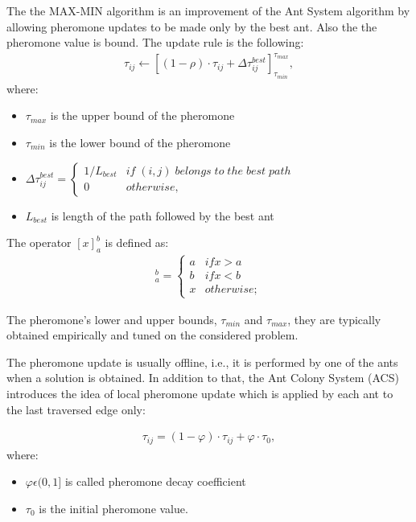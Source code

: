 The the MAX-MIN algorithm is an improvement of the Ant System algorithm by allowing pheromone updates to be made only by the best ant. Also the the pheromone  value is bound. The update rule is the following:
\begin{align}
	\tau_{ij} \leftarrow \left[ \left(1-\rho \right) \cdot \tau_{ij} + \Delta \tau_{ij}^{best} \right] _{\tau_{min}}^{\tau_{max}},
\end{align}
where:
\begin{itemize}
\item  $\tau_{max}$ is the upper bound of the pheromone
\item $\tau_{min}$ is the lower bound of the pheromone
\item $\Delta \tau_{ij}^{best} = \left\{
		\begin{array}{ll}
			1/L_{best} & if\; (i, j)\; belongs \;to\; the\; best\; path\\
			0 & otherwise,
		\end{array}
	\right.$
\item 	$L_{best}$ is length of the path followed by  the best ant
\end{itemize}

The operator $[x]_{a}^{b}$ is defined as:
\begin{align}
	[x]_{a}^{b} = \left\{
		\begin{array}{ll}
			a & if x > a\\
			b & if x < b\\
			x & otherwise;
		\end{array}
	\right.
\end{align}

The pheromone's lower and upper bounds, $\tau_{min}$ and $\tau_{max}$, they are typically obtained empirically and tuned on the considered problem.

The pheromone update is usually offline, i.e., it is performed by one of the ants when a solution is obtained. In addition to that, the Ant Colony System (ACS) introduces the idea of local pheromone update which is applied by each ant to the last traversed edge only: 

\begin{align}
	\tau_{ij} = (1 - \varphi)\cdot \tau_{ij} + \varphi \cdot \tau_{0},
\end{align}
where:
\begin{itemize}
\item $\varphi \epsilon (0, 1]$ is called pheromone decay coefficient
\item $\tau_{0}$ is the initial pheromone value.
\end{itemize}

